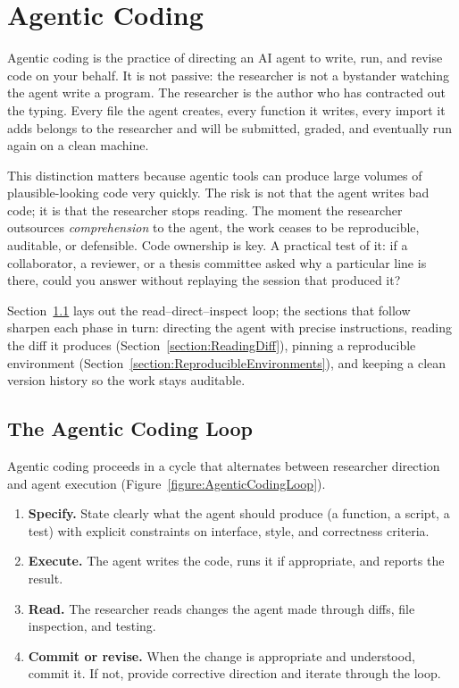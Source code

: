 \chapter{Agentic Coding}
\label{chapter:AgenticCoding}

Agentic coding is the practice of directing an AI agent to write, run, and revise code on your behalf.
It is not passive: the researcher is not a bystander watching the agent write a program.
The researcher is the author who has contracted out the typing.
Every file the agent creates, every function it writes, every import it adds belongs to the researcher and will be submitted, graded, and eventually run again on a clean machine.

This distinction matters because agentic tools can produce large volumes of plausible-looking code very quickly.
The risk is not that the agent writes bad code; it is that the researcher stops reading.
The moment the researcher outsources \emph{comprehension} to the agent, the work ceases to be reproducible, auditable, or defensible.
Code ownership is key.
A practical test of it: if a collaborator, a reviewer, or a thesis committee asked why a particular line is there, could you answer without replaying the session that produced it?

Section~\ref{section:AgenticCodingLoop} lays out the read--direct--inspect loop; the sections that follow sharpen each phase in turn: directing the agent with precise instructions, reading the diff it produces (Section~\ref{section:ReadingDiff}), pinning a reproducible environment (Section~\ref{section:ReproducibleEnvironments}), and keeping a clean version history so the work stays auditable.

\section{The Agentic Coding Loop}
\label{section:AgenticCodingLoop}

Agentic coding proceeds in a cycle that alternates between researcher direction and agent execution (Figure~\ref{figure:AgenticCodingLoop}).

\begin{enumerate}
\item \textbf{Specify.} State clearly what the agent should produce (a function, a script, a test) with explicit constraints on interface, style, and correctness criteria.
\item \textbf{Execute.} The agent writes the code, runs it if appropriate, and reports the result.
\item \textbf{Read.} The researcher reads changes the agent made through diffs, file inspection, and testing.
\item \textbf{Commit or revise.} When the change is appropriate and understood, commit it. If not, provide corrective direction and iterate through the loop.
\end{enumerate}

